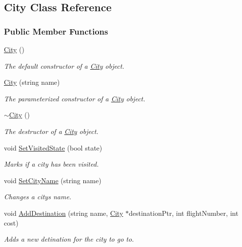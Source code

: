 \hypertarget{class_city}{}\subsection{City Class Reference}
\label{class_city}
\subsubsection*{Public Member Functions}
\begin{DoxyCompactItemize}
\item 
\hyperlink{class_city_a1b1f549430f0a7ecd0ec7b1605415193}{City} ()
\begin{DoxyCompactList}\small\item\em The default constructor of a \hyperlink{class_city}{City} object. \end{DoxyCompactList}\item 
\hyperlink{class_city_a545dc78812f823306a87073d9269d79b}{City} (string name)
\begin{DoxyCompactList}\small\item\em The parameterized constructor of a \hyperlink{class_city}{City} object. \end{DoxyCompactList}\item 
\hyperlink{class_city_ae95feee8a1d4e1f14ea41ec89b47304f}{$\sim$\+City} ()
\begin{DoxyCompactList}\small\item\em The destructor of a \hyperlink{class_city}{City} object. \end{DoxyCompactList}\item 
void \hyperlink{class_city_a8693fc54b2bbbef00c60da8bc3605380}{Set\+Visited\+State} (bool state)
\begin{DoxyCompactList}\small\item\em Marks if a city has been visited. \end{DoxyCompactList}\item 
void \hyperlink{class_city_a73b24c91a77311e3afdc202072a0386b}{Set\+City\+Name} (string name)
\begin{DoxyCompactList}\small\item\em Changes a city\textquotesingle{}s name. \end{DoxyCompactList}\item 
void \hyperlink{class_city_a5a6aacf0d15979aff62d189a910320e6}{Add\+Destination} (string name, \hyperlink{class_city}{City} $\ast$destination\+Ptr, int flight\+Number, int cost)
\begin{DoxyCompactList}\small\item\em Adds a new detination for the city to go to. \end{DoxyCompactList}\item 

\end{DoxyCompactItemize}
